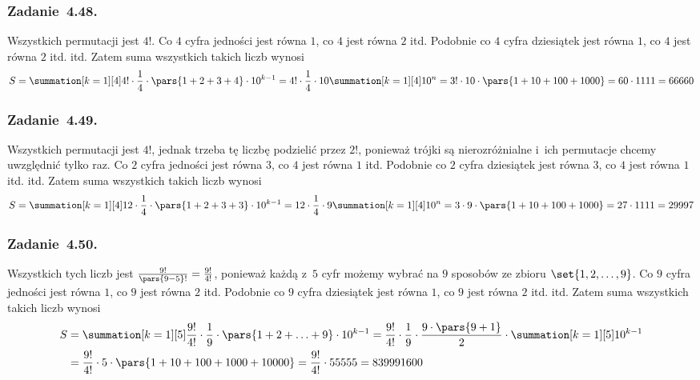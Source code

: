 \subsubsection*{Zadanie~4.48.}
Wszystkich permutacji jest \(4!\). Co \(4\) cyfra jedności jest równa \(1\), co \(4\) jest równa \(2\) itd. Podobnie co \(4\) cyfra dziesiątek jest równa \(1\), co \(4\) jest równa \(2\) itd. itd. Zatem suma wszystkich takich liczb wynosi
\begin{equation*}
    S
        = \summation[k = 1][4] 4! \cdot \frac{1}{4} \cdot \pars{1 + 2 + 3 + 4} \cdot 10^{k - 1}
        = 4! \cdot \frac{1}{4} \cdot 10 \summation[k = 1][4] 10^{n}
        = 3! \cdot 10 \cdot \pars{1 + 10 + 100 + 1000}
        = 60 \cdot 1111
        = 66660
\end{equation*}
\subsubsection*{Zadanie~4.49.}
Wszystkich permutacji jest \(4!\), jednak trzeba tę liczbę podzielić przez \(2!\), ponieważ trójki są nierozróżnialne i~ich permutacje chcemy uwzględnić tylko raz. Co \(2\) cyfra jedności jest równa \(3\), co \(4\) jest równa \(1\) itd. Podobnie co \(2\) cyfra dziesiątek jest równa \(3\), co \(4\) jest równa \(1\) itd. itd. Zatem suma wszystkich takich liczb wynosi
\begin{equation*}
    S
        = \summation[k = 1][4] 12 \cdot \frac{1}{4} \cdot \pars{1 + 2 + 3 + 3} \cdot 10^{k - 1}
        = 12 \cdot \frac{1}{4} \cdot 9 \summation[k = 1][4] 10^{n}
        = 3 \cdot 9 \cdot \pars{1 + 10 + 100 + 1000}
        = 27 \cdot 1111
        = 29997
\end{equation*}
\subsubsection*{Zadanie~4.50.}
Wszystkich tych liczb jest \(\frac{9!}{\pars{9 - 5}!} = \frac{9!}{4!}\), ponieważ każdą z~\(5\) cyfr możemy wybrać na \(9\) sposobów ze zbioru \(\set{1, 2, \ldots, 9}\). Co \(9\) cyfra jedności jest równa \(1\), co \(9\) jest równa \(2\) itd. Podobnie co \(9\) cyfra dziesiątek jest równa \(1\), co \(9\) jest równa \(2\) itd. itd. Zatem suma wszystkich takich liczb wynosi
\begin{equation*}
    \begin{split}
        S
            &= \summation[k = 1][5] \frac{9!}{4!} \cdot \frac{1}{9} \cdot \pars{1 + 2 + \ldots + 9} \cdot 10^{k - 1}
            = \frac{9!}{4!} \cdot \frac{1}{9} \cdot \frac{9 \cdot \pars{9 + 1}}{2} \cdot \summation[k = 1][5] 10^{k - 1}\\
            &= \frac{9!}{4!} \cdot 5 \cdot \pars{1 + 10 + 100 + 1000 + 10000}
            = \frac{9!}{4!} \cdot 55555
            = 839991600
    \end{split}
\end{equation*}
